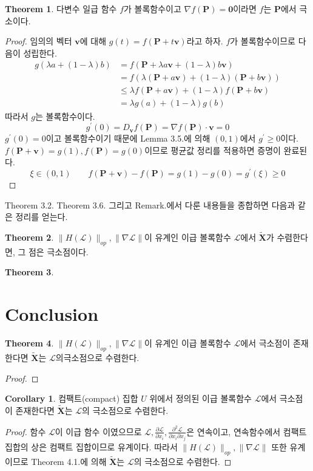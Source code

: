 \documentclass[a4paper,20pt]{article}
\theoremstyle{definition}
\newtheorem{theorem}{Theorem}[section]
\newtheorem{corollary}{Corollary}[theorem]
\newcommand{\curve}[1][X]{\tilde{\mathbf{#1}}}
\begin{document}
\begin{theorem}
다변수 일급 함수 $f$가 볼록함수이고 $\nabla f(\mathbf{P})=\mathbf{0}$이라면 $f$는 $\mathbf{P}$에서 극소이다.
\end{theorem}
\begin{proof}
임의의 벡터 $\mathbf{v}$에 대해 $g(t)=f(\mathbf{P}+t\mathbf{v})$라고 하자. $f$가 볼록함수이므로 다음이 성립한다.
\begin{align*}
g(\lambda a+(1-\lambda) b)&=f(\mathbf{P}+\lambda a\mathbf{v}+(1-\lambda) b\mathbf{v})\\&=f(\lambda(\mathbf{P}+a\mathbf{v})+(1-\lambda)(\mathbf{P}+b\mathbf{v}))\\&\leq\lambda f(\mathbf{P}+a\mathbf{v})+(1-\lambda)f(\mathbf{P}+b\mathbf{v})\\&=\lambda g(a)+(1-\lambda) g(b)
\end{align*}
따라서 $g$는 볼록함수이다. 
$$g^{\prime}(0)=D_{\mathbf{v}}f(\mathbf{P})=\nabla f(\mathbf{P})\cdot\mathbf{v}=0$$
$g^{\prime}(0)=0$이고 볼록함수이기 때문에 Lemma 3.5.에 의해 $(0,1)$에서 $g^{\prime}\geq 0$이다.
$f(\mathbf{P}+\mathbf{v})=g(1), f(\mathbf{P})=g(0)$이므로 평균값 정리를 적용하면 증명이 완료된다.
$$\xi \in (0,1) \qquad f(\mathbf{P}+\mathbf{v})-f(\mathbf{P})=g(1)-g(0)=g^{\prime}(\xi)\geq 0 $$
\end{proof}


Theorem 3.2. Theorem 3.6. 그리고 Remark.에서 다룬 내용들을 종합하면 다음과 같은 정리를 얻는다.
\begin{theorem}
$\|H(\mathcal{L})\|_{op}, \|\nabla\mathcal{L}\|$이 유계인 이급 볼록함수 $\mathcal{L}$에서 $\curve$가 수렴한다면, 그 점은 극소점이다.
\end{theorem}


\begin{theorem}

\end{theorem}


\section{Conclusion}

\begin{theorem}
$\|H(\mathcal{L})\|_{op}, \|\nabla\mathcal{L}\|$이 유계인 이급 볼록함수 $\mathcal{L}$에서 극소점이 존재한다면 $\curve$는 $\mathcal{L}$의극소점으로 수렴한다.
\end{theorem}
\begin{proof}

\end{proof}
\begin{corollary}
컴팩트(compact) 집합 $U$ 위에서 정의된 이급 볼록함수 $\mathcal{L}$에서 극소점이 존재한다면 $\curve$는 $\mathcal{L}$의 극소점으로 수렴한다.
\end{corollary}
\begin{proof}
함수 $\mathcal{L}$이 이급 함수 이였으므로 $\mathcal{L}, \frac{\partial\mathcal{L}}{\partial x_{i}}, \frac{\partial^{2}\mathcal{L}}{\partial x_{i}\partial x_{j}}$은 연속이고,
연속함수에서 컴팩트 집합의 상은 컴팩트 집합이므로 유계이다. 따라서 $\|H(\mathcal{L})\|_{op}, \|\nabla\mathcal{L}\|$ 또한 유계이므로 Theorem 4.1.에 의해 $\curve$는 $\mathcal{L}$의 극소점으로 수렴한다.
\end{proof}
\end{document}
